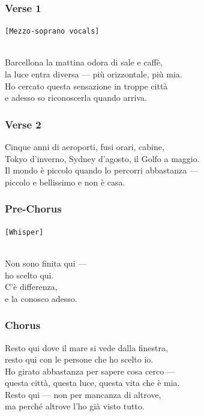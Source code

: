 \subsubsection{Verse 1}\label{verse-1-14}

\texttt{{[}Mezzo-soprano\ vocals{]}}\strut \\
Barcellona la mattina odora di sale e caffè,\\
la luce entra diversa --- più orizzontale, più mia.\\
Ho cercato questa sensazione in troppe città\\
e adesso so riconoscerla quando arriva.

\subsubsection{Verse 2}\label{verse-2-14}

Cinque anni di aeroporti, fusi orari, cabine,\\
Tokyo d'inverno, Sydney d'agosto, il Golfo a maggio.\\
Il mondo è piccolo quando lo percorri abbastanza ---\\
piccolo e bellissimo e non è casa.

\subsubsection{Pre-Chorus}\label{pre-chorus-31}

\texttt{{[}Whisper{]}}\strut \\
Non sono finita qui ---\\
ho scelto qui.\\
C'è differenza,\\
e la conosco adesso.

\subsubsection{Chorus}\label{chorus-46}

Resto qui dove il mare si vede dalla finestra,\\
resto qui con le persone che ho scelto io.\\
Ho girato abbastanza per sapere cosa cerco ---\\
questa città, questa luce, questa vita che è mia.\\
Resto qui --- non per mancanza di altrove,\\
ma perché altrove l'ho già visto tutto.

